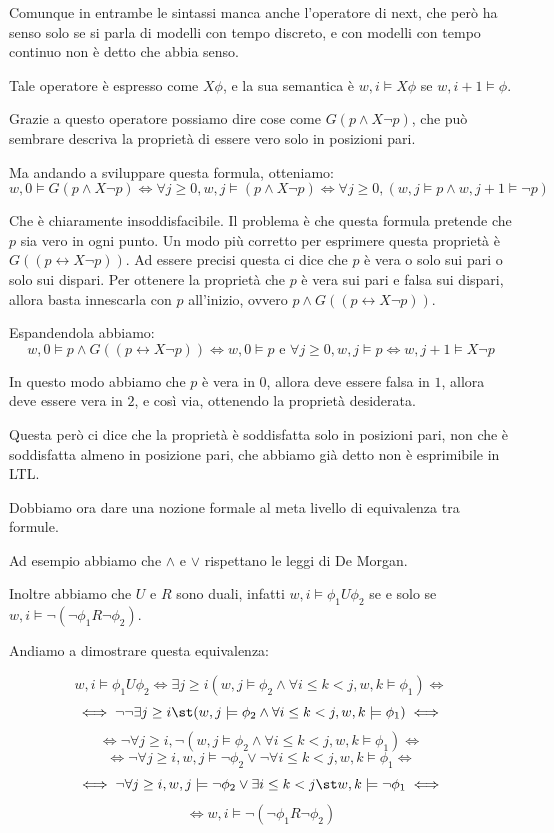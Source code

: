 Comunque in entrambe le sintassi manca anche l'operatore di next, che però ha senso solo se si parla di modelli con tempo discreto, e con modelli con tempo continuo non è detto che abbia senso.

Tale operatore è espresso come \(X \phi\), e la sua semantica è \(w,i \models X\phi\) se \(w,i+1 \models \phi\).

Grazie a questo operatore possiamo dire cose come \(G(p\land X \neg p)\), che può sembrare descriva la proprietà di essere vero solo in posizioni pari.

Ma andando a sviluppare questa formula, otteniamo:
\[w,0\models G(p\land X \neg p) \iff \forall j \geq 0, w,j \models (p\land X \neg p) \iff \forall j \geq 0, (w,j \models p \land w,j+1 \models \neg p)\]

Che è chiaramente insoddisfacibile. Il problema è che questa formula pretende che \(p\) sia vero in ogni punto.
Un modo più corretto per esprimere questa proprietà è \(G((p \leftrightarrow X \neg p) )\). Ad essere precisi questa ci dice che \(p\) è vera o solo sui pari o solo sui dispari. Per ottenere la proprietà che \(p\) è vera sui pari e falsa sui dispari, allora basta innescarla con \(p\) all'inizio, ovvero \(p \land G((p \leftrightarrow X \neg p) )\).

Espandendola abbiamo:
\[w,0 \models p \land G((p \leftrightarrow X \neg p) )\iff w,0 \models p \text{ e } \forall j \geq 0, w,j \models p \iff w,j+1 \models X \neg p\]

In questo modo abbiamo che \(p\) è vera in \(0\), allora deve essere falsa in \(1\), allora deve essere vera in \(2\), e così via, ottenendo la proprietà desiderata.

Questa però ci dice che la proprietà è soddisfatta solo in posizioni pari, non che è soddisfatta almeno in posizione pari, che abbiamo già detto non è esprimibile in LTL\@.

Dobbiamo ora dare una nozione formale al meta livello di equivalenza tra formule.

Ad esempio abbiamo che \(\land\) e \(\lor\) rispettano le leggi di De Morgan.

Inoltre abbiamo che \(U\) e \(R\) sono duali, infatti \(w,i \models \phi_1 U \phi_2\) se e solo se \(w,i \models \neg (\neg \phi_1 R \neg \phi_2)\).

Andiamo a dimostrare questa equivalenza:

\[w,i\models \phi_1 U \phi_2 \iff \exists j \geq i( w,j \models \phi_2 \land \forall i\leq k < j, w,k\models \phi_1)\iff\]
\[\iff \neg \neg \exists j \geq i\st( w,j \models \phi_2 \land \forall i\leq k < j, w,k\models \phi_1) \iff\]
\[\iff \neg \forall j \geq i,\neg( w,j \models \phi_2 \land \forall i\leq k < j, w,k\models \phi_1) \iff\]
\[\iff \neg \forall j \geq i, w,j \models \neg \phi_2 \lor \neg \forall i\leq k < j, w,k\models \phi_1 \iff\]
\[\iff \neg \forall j \geq i, w,j \models \neg \phi_2 \lor \exists i \leq k < j\st w,k\models \neg \phi_1 \iff\]
\[\iff w,i \models \neg (\neg \phi_1 R \neg \phi_2)\]

